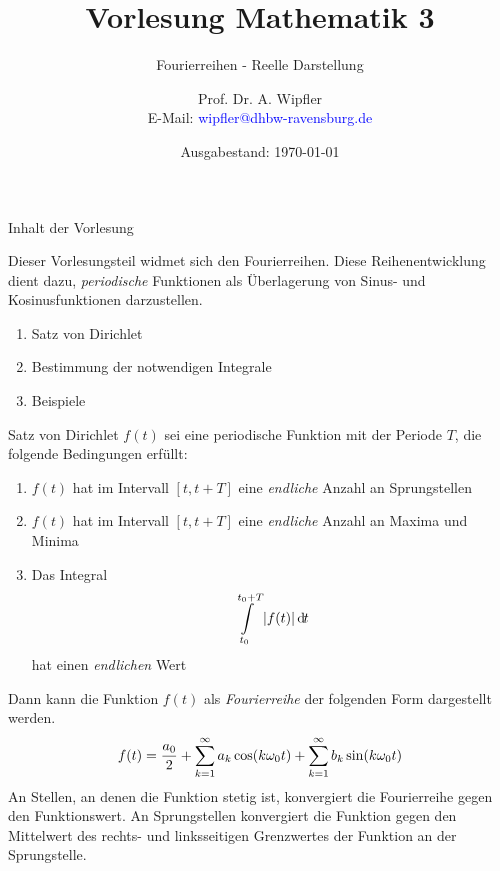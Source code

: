 \documentclass[t,14pt]{beamer}
\title[]{Vorlesung Mathematik 3}
\subtitle{Fourierreihen - Reelle Darstellung}
\author[]{Prof. Dr. A. Wipfler\\ E-Mail: \textcolor{blue}{wipfler@dhbw-ravensburg.de}}
\institute[]{{\footnotesize Duale Hochschule Baden-W\"urttemberg, Ravensburg/Friedrichshafen}}
\date[]{Ausgabestand: \today}
\newcommand*\diff{\mathop{}\!\mathrm{d\hspace{-1pt}}}	%
\begin{document}
\begin{frame}
\titlepage
\end{frame}





\begin{frame}{Inhalt der Vorlesung}


Dieser Vorlesungsteil widmet sich den Fourierreihen. Diese Reihenentwicklung dient dazu, \emph{periodische} Funktionen als Überlagerung von Sinus- 
und Kosinusfunktionen darzustellen.
\begin{enumerate}
\item Satz von Dirichlet
\item Bestimmung der notwendigen Integrale
\item Beispiele
\end{enumerate}

\end{frame}


\begin{frame}
\begin{alertblock}{Satz von Dirichlet}
$f(t)$ sei eine periodische Funktion mit der Periode $T$, die folgende Bedingungen erfüllt:
\begin{enumerate}
\item $f(t)$ hat im Intervall $[t,t+T]$ eine \emph{endliche} Anzahl an Sprungstellen
\item $f(t)$ hat im Intervall $[t,t+T]$ eine \emph{endliche} Anzahl an Maxima und Minima
\item Das Integral
\[
\intl_{t_0}^{t_0+T}|f(t)|\diff t 
\]
hat einen \emph{endlichen} Wert
\end{enumerate}
Dann kann die Funktion $f(t)$ als \emph{Fourierreihe} der folgenden Form dargestellt werden.
\[
f(t)=\frac{a_0}{2}+\sum\limits_{k=1}^{\infty}a_k\cos(k\omega_0 t)+\sum\limits_{k=1}^{\infty}b_k\sin(k\omega_0 t)
\]
An Stellen, an denen die Funktion stetig ist, konvergiert die Fourierreihe gegen den Funktionswert. An Sprungstellen konvergiert die Funktion 
gegen den Mittelwert des rechts- und linksseitigen Grenzwertes der Funktion an der Sprungstelle.
\end{alertblock}
\end{frame}



\end{document}
